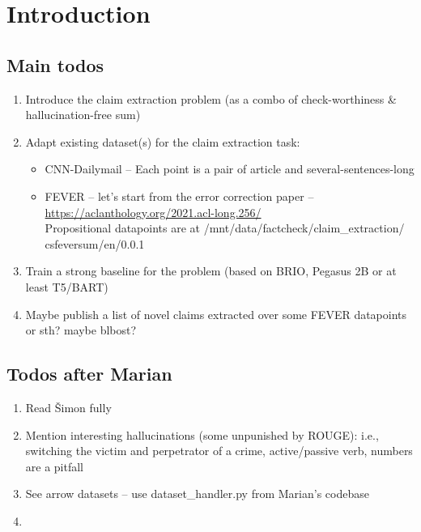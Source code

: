\section{Introduction}\label{sec:intro}
\todo{}
\subsection{Main todos}
\begin{enumerate}
    \item Introduce the claim extraction problem (as a combo of check-worthiness \& hallucination-free sum)
    \item Adapt existing dataset(s) for the claim extraction task:
     \begin{itemize}
        \item CNN-Dailymail -- Each point is a pair of article and several-sentences-long 
        \item FEVER -- let's start from the error correction paper -- \url{https://aclanthology.org/2021.acl-long.256/}\\
        Propositional datapoints are at /mnt/data/factcheck/claim\_extraction/ csfeversum/en/0.0.1
    \end{itemize}
    \item Train a strong baseline for the problem (based on BRIO, Pegasus 2B or at least T5/BART)
    \item Maybe publish a list of novel claims extracted over some FEVER datapoints or sth? maybe blbost?
\end{enumerate}

\subsection{Todos after Marian}
\begin{enumerate}
    \item Read Šimon fully
    \item Mention interesting hallucinations (some unpunished by ROUGE):  i.e., switching the victim and perpetrator of a crime, active/passive verb, numbers are a pitfall
    \item See arrow datasets -- use dataset\_handler.py from Marian's codebase
    \item 
\end{enumerate}
